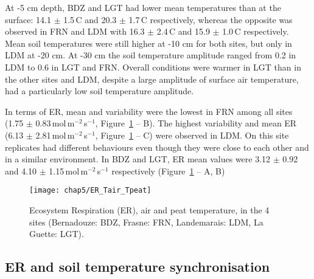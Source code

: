 At -5 cm depth, BDZ and LGT had lower mean temperatures than at the surface: 14.1 $\pm$ 1.5\,\textdegree C and 20.3 $\pm$ 1.7\,\textdegree C respectively, whereas the opposite was observed in FRN and LDM with 16.3 $\pm$ 2.4\,\textdegree C and 15.9 $\pm$ 1.0\,\textdegree C respectively.
Mean soil temperatures were still higher at -10 cm for both sites, but only in LDM at -20 cm.
At -30 cm the soil temperature amplitude ranged from 0.2 in LDM to 0.6 in LGT and FRN.
Overall conditions were warmer in LGT than in the other sites and LDM, despite a large amplitude of surface air temperature, had a particularly low soil temperature amplitude.

In terms of ER, mean and variability were the lowest in FRN among all sites (1.75 $\pm$ 0.83\,\textmu mol\,m$^{-2}$\,s$^{-1}$, Figure~\ref{fig:er_tair_tpeat} -- B).
The highest variability and mean ER (6.13 $\pm$ 2.81\,\textmu mol\,m$^{-2}$\,s$^{-1}$, Figure~\ref{fig:er_tair_tpeat} -- C) were observed in LDM.
On this site replicates had different behaviours even though they were close to each other and in a similar environment.
In BDZ and LGT, ER mean values were 3.12 $\pm$ 0.92 and 4.10 $\pm$ 1.15\,\textmu mol\,m$^{-2}$\,s$^{-1}$ respectively (Figure~\ref{fig:er_tair_tpeat} -- A, B)

\begin{figure}
\centering
\texttt{[image: chap5/ER\_Tair\_Tpeat]}
\caption{Ecosystem Respiration (ER), air and peat temperature, in the 4 sites (Bernadouze: BDZ, Frasne: FRN, Landemarais: LDM, La Guette: LGT).}
\label{fig:er_tair_tpeat}
\end{figure}

\subsection{ER and soil temperature synchronisation}

